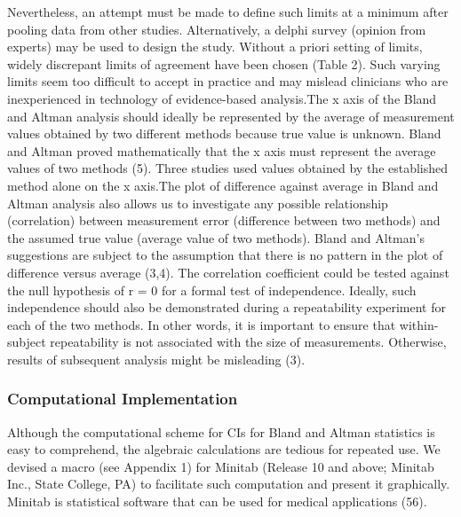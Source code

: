 \documentclass[]{article}
\begin{document}
Nevertheless, an attempt must be made to define such limits at a minimum after pooling data from other studies. Alternatively, a delphi survey (opinion from experts) may be used to design the study. Without a priori setting of limits, widely discrepant limits of agreement have been chosen (Table 2). Such varying limits seem too difficult to accept in practice and may mislead clinicians who are inexperienced in technology of evidence-based analysis.The x axis of the Bland and Altman analysis should ideally be represented by the average of measurement values obtained by two different methods because true value is unknown. Bland and Altman proved mathematically that the x axis must represent the average values of two methods (5). Three studies used values obtained by the established method alone on the x axis.The plot of difference against average in Bland and Altman analysis also allows us to investigate any possible relationship (correlation) between measurement error (difference between two methods) and the assumed true value (average value of two methods). 
Bland and Altman’s suggestions are subject to the assumption that there is no pattern in the plot of difference versus average (3,4). The correlation coefficient could be tested against the null hypothesis of r = 0 for a formal test of independence. Ideally, such independence should also be demonstrated during a repeatability experiment for each of the two methods. In other words, it is important to ensure that within-subject repeatability is not associated with the size of measurements. Otherwise, results of subsequent analysis might be misleading (3).

\subsubsection*{Computational Implementation}
Although the computational scheme for CIs for Bland and Altman statistics is easy to comprehend, the algebraic calculations are tedious for repeated use. We devised a macro (see Appendix 1) for Minitab (Release 10 and above; Minitab Inc., State College, PA) to facilitate such computation and present it graphically. Minitab is statistical software that can be used for medical applications (56).
\end{document}
